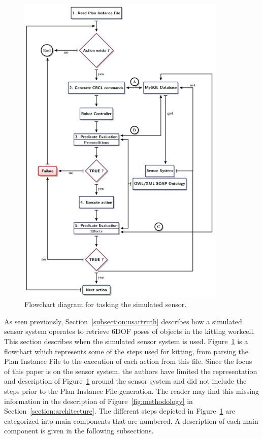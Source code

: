 
\begin{figure}[!t!h!b!]
\centering
\includegraphics[width=10cm]{images/flowchart.pdf}
\caption{Flowchart diagram for tasking the simulated sensor.}
\label{fig:sensor}
\end{figure}

As seen previously, Section~\ref{subsection:usartruth} describes how a simulated sensor system operates to retrieve 6DOF poses of objects in the kitting workcell. This section describes when the simulated sensor system is used. Figure~\ref{fig:sensor} is a flowchart which represents some of the steps used for kitting, from parsing the \textsf{Plan Instance File} to the execution of each action from this file. Since the focus of this paper is on the sensor system, the authors have limited the representation and description of Figure~\ref{fig:sensor} around the sensor system and did not include the steps prior to the \textsf{Plan Instance File} generation. The reader may find this missing information in the description of Figure~\ref{fig:methodology} in Section~\ref{section:architecture}. The different steps depicted in Figure~\ref{fig:sensor} are categorized into main components that are numbered. A description of each main component is given in the following subsections.

